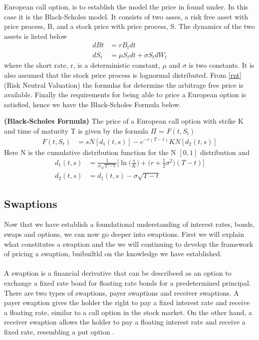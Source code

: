 European call option, is to establish the model the price in found under. In this case it is the Black-Scholes model.
It consists of two asses, a risk free asset with price process, B, and a stock price with price process, S.
The dynamics of the two assets is listed below
\begin{align*}
    dBt & = rB_t dt \\
    dS_t &= \mu S_t dt + \sigma S_t dW_t
\end{align*}
where the short rate, r, is  a deterministic constant,  $\mu$ and $\sigma$ is two constants. It is also assumed
that the stock price process is lognormal distributed. From \autoref{rnt}
(Risk Neutral Valuation) the formulas for determine the arbitrage free price is available. Finally the requirements
for being able to price a European option is satisfied, hence we have the Black-Scholes Formula below.
\begin{proposition}
    \textbf{(Black-Scholes Formula)} The price of a European call option with strike K and time of maturity T 
    is given by the formula $\Pi$ = $F(t,S_t)$
    \begin{align*}
        F(t,S_t) & =s N[d_1(t,s)] -e^{-r(T-t)}KN[d_2(t,s)] 
    \end{align*}
    Here N is the cumulative distribution function for the N $[0,1]$ distribution and 
    \begin{align*}
        d_1(t,s) &= \frac{1}{\sigma \sqrt{T-t}} \Big[ \ln \Big(\frac{s}{K} \Big) +  \Big(r + \frac{1}{2} \sigma^2)(T-t)  \Big] \\
        d_2(t,s) &= d_1(t,s)-\sigma \sqrt{T-t}
    \end{align*}
    \cite{Bjork}
\end{proposition}
\subsection{Swaptions}
Now that we have establish a foundational understanding of interest rates, bonds, swaps and options, we can
now go deeper into swaptions. First we will explain what constitutes a swaption and the we will continuing 
to develop the framework of pricing a swaption, buibuiltld on the knowledge we have established.  
\\\\
A swaption is a financial derivative that can be describeed as an option to exchange a fixed rate bond for
floating rate bonds for a predetermined principal. 
There are two types of swaptions, payer swaptions and receiver swaptions.
A payer swaption gives the holder the right to pay a fixed interest rate and receive a floating rate, 
similar to a call option in the stock market. On the other hand, a receiver swaption allows the holder
to pay a floating interest rate and receive a fixed rate, resembling a put option \cite{Lindstrom} .

